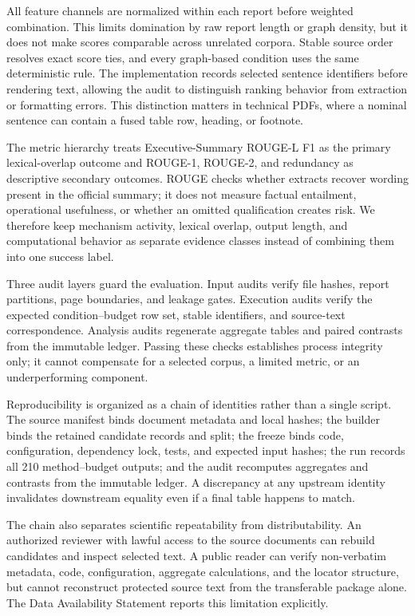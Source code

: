 \documentclass[applsci,article,submit,moreauthors]{Definitions/mdpi}
\begin{document}
All feature channels are normalized within each report before weighted combination. This limits domination by raw report length or graph density, but it does not make scores comparable across unrelated corpora. Stable source order resolves exact score ties, and every graph-based condition uses the same deterministic rule. The implementation records selected sentence identifiers before rendering text, allowing the audit to distinguish ranking behavior from extraction or formatting errors. This distinction matters in technical PDFs, where a nominal sentence can contain a fused table row, heading, or footnote.

The metric hierarchy treats Executive-Summary ROUGE-L F1 as the primary lexical-overlap outcome and ROUGE-1, ROUGE-2, and redundancy as descriptive secondary outcomes. ROUGE checks whether extracts recover wording present in the official summary; it does not measure factual entailment, operational usefulness, or whether an omitted qualification creates risk. We therefore keep mechanism activity, lexical overlap, output length, and computational behavior as separate evidence classes instead of combining them into one success label.

Three audit layers guard the evaluation. Input audits verify file hashes, report partitions, page boundaries, and leakage gates. Execution audits verify the expected condition--budget row set, stable identifiers, and source-text correspondence. Analysis audits regenerate aggregate tables and paired contrasts from the immutable ledger. Passing these checks establishes process integrity only; it cannot compensate for a selected corpus, a limited metric, or an underperforming component.

Reproducibility is organized as a chain of identities rather than a single script. The source manifest binds document metadata and local hashes; the builder binds the retained candidate records and split; the freeze binds code, configuration, dependency lock, tests, and expected input hashes; the run records all 210 method--budget outputs; and the audit recomputes aggregates and contrasts from the immutable ledger. A discrepancy at any upstream identity invalidates downstream equality even if a final table happens to match.

The chain also separates scientific repeatability from distributability. An authorized reviewer with lawful access to the source documents can rebuild candidates and inspect selected text. A public reader can verify non-verbatim metadata, code, configuration, aggregate calculations, and the locator structure, but cannot reconstruct protected source text from the transferable package alone. The Data Availability Statement reports this limitation explicitly.
\end{document}
